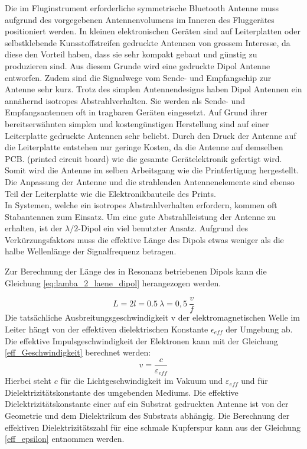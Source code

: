 Die im Fluginstrument erforderliche symmetrische Bluetooth Antenne muss aufgrund des vorgegebenen Antennenvolumens im Inneren des Fluggerätes positioniert werden. In kleinen elektronischen Geräten sind auf Leiterplatten oder selbstklebende Kunsstoffstreifen gedruckte Antennen von grossem Interesse, da diese den Vorteil haben, dass sie sehr kompakt gebaut und günstig zu produzieren sind. Aus diesem Grunde wird eine gedruckte Dipol Antenne entworfen. Zudem sind die Signalwege vom Sende- und Empfangschip zur Antenne sehr kurz. Trotz des simplen Antennendesigns haben Dipol Antennen ein annähernd isotropes Abstrahlverhalten. Sie werden als Sende- und Empfangsantennen oft in  tragbaren Geräten eingesetzt. Auf Grund ihrer bereitserwähnten simplen und kostengünstigen Herstellung sind auf einer Leiterplatte gedruckte Antennen sehr beliebt. Durch den Druck der Antenne auf die Leiterplatte entstehen nur geringe Kosten, da die Antenne auf demselben PCB. (printed circuit board) wie die gesamte Gerätelektronik gefertigt wird. Somit wird die Antenne im selben Arbeitsgang wie die Printfertigung hergestellt. Die  Anpassung der Antenne und die strahlenden Antennenelemente sind ebenso Teil der Leiterplatte wie die Elektronikbauteile des Prints.\\
In Systemen, welche ein isotropes Abstrahlverhalten erfordern, kommen oft Stabantennen zum Einsatz. Um eine gute Abstrahlleistung der Antenne zu erhalten, ist der $\lambda /2$-Dipol ein viel benutzter Ansatz. Aufgrund des Verkürzungsfaktors muss die effektive Länge des Dipols etwas weniger als die halbe Wellenlänge der Signalfrequenz betragen.  
 
Zur Berechnung der Länge des in Resonanz betriebenen Dipols kann die  Gleichung \ref{eq:lamba_2_laene_dipol} herangezogen werden.

\begin{equation}\label{eq:lamba_2_laene_dipol}
L = 2l = 0.5 \  \lambda= 0,5 \  \dfrac{v}{f}
\end{equation} 
Die tatsächliche Ausbreitungsgeschwindigkeit v der elektromagnetischen Welle im Leiter hängt von der effektiven dielektrischen Konstante $\epsilon_{eff}$ der Umgebung  ab. 
Die effektive  Impulsgeschwindigkeit der Elektronen kann mit der Gleichung \ref{eff_Geschwindigkeit} berechnet werden:
\begin{equation}\label{eff_Geschwindigkeit}
v = \dfrac{c}{\varepsilon_{eff}}
\end{equation}
Hierbei steht $c$ für die Lichtgeschwindigkeit im Vakuum und $\varepsilon_{eff}$ und für Dielektrizitätskonstante des umgebenden Mediums. Die effektive Dielektrizitätskonstante einer auf ein Substrat gedruckten Antenne ist von der  Geometrie und dem Dielektrikum des Substrats abhängig. Die Berechnung der effektiven Dielektrizitätszahl für eine schmale Kupferspur kann aus der Gleichung \ref{eff_epsilon} entnommen werden. 

